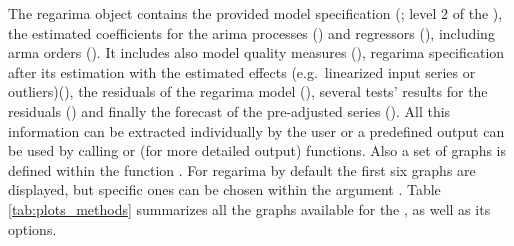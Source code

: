\documentclass[article]{jss}
\begin{document}
The regarima object contains the provided model specification
(; level 2 of the ), the estimated
coefficients for the arima processes () and
regressors (), including arma orders
(). It includes also model quality measures (),
regarima specification after its estimation with the estimated effects
(e.g.~linearized input series or outliers)(), the residuals
of the regarima model (), several tests' results for the
residuals () and finally the forecast of the
pre-adjusted series (). All this information can be
extracted individually by the user or a predefined output can be used by
calling  or  (for more detailed output)
functions. Also a set of graphs is defined within the function
. For regarima by default the first six graphs are
displayed, but specific ones can be chosen within the argument
. Table \ref{tab:plots_methods} summarizes all the graphs
available for the , as well as its 
options.
\end{document}
